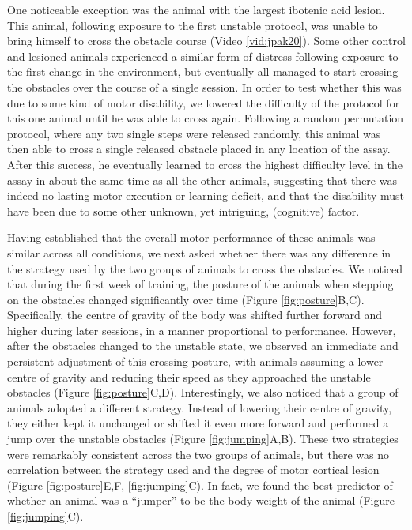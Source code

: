 One noticeable exception was the animal with the largest ibotenic acid lesion. This animal, following exposure to the first unstable protocol, was unable to bring himself to cross the obstacle course (Video \ref{vid:jpak20}). Some other control and lesioned animals experienced a similar form of distress following exposure to the first change in the environment, but eventually all managed to start crossing the obstacles over the course of a single session. In order to test whether this was due to some kind of motor disability, we lowered the difficulty of the protocol for this one animal until he was able to cross again. Following a random permutation protocol, where any two single steps were released randomly, this animal was then able to cross a single released obstacle placed in any location of the assay. After this success, he eventually learned to cross the highest difficulty level in the assay in about the same time as all the other animals, suggesting that there was indeed no lasting motor execution or learning deficit, and that the disability must have been due to some other unknown, yet intriguing, (cognitive) factor. 

Having established that the overall motor performance of these animals was similar across all conditions, we next asked whether there was any difference in the strategy used by the two groups of animals to cross the obstacles. We noticed that during the first week of training, the posture of the animals when stepping on the obstacles changed significantly over time (Figure \ref{fig:posture}B,C). Specifically, the centre of gravity of the body was shifted further forward and higher during later sessions, in a manner proportional to performance. However, after the obstacles changed to the unstable state, we observed an immediate and persistent adjustment of this crossing posture, with animals assuming a lower centre of gravity and reducing their speed as they approached the unstable obstacles (Figure \ref{fig:posture}C,D). Interestingly, we also noticed that a group of animals adopted a different strategy. Instead of lowering their centre of gravity, they either kept it unchanged or shifted it even more forward and performed a jump over the unstable obstacles (Figure \ref{fig:jumping}A,B). These two strategies were remarkably consistent across the two groups of animals, but there was no correlation between the strategy used and the degree of motor cortical lesion (Figure \ref{fig:posture}E,F, \ref{fig:jumping}C). In fact, we found the best predictor of whether an animal was a ``jumper'' to be the body weight of the animal (Figure \ref{fig:jumping}C).

